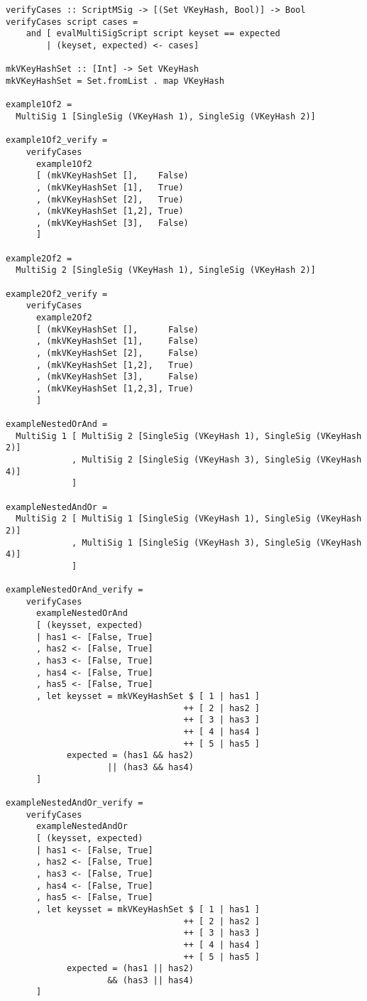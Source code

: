 \documentclass[11pt,a4paper,dvipsnames]{article}
\theoremstyle{definition}
\begin{document}
\begin{verbatim}
verifyCases :: ScriptMSig -> [(Set VKeyHash, Bool)] -> Bool
verifyCases script cases =
    and [ evalMultiSigScript script keyset == expected
        | (keyset, expected) <- cases]

mkVKeyHashSet :: [Int] -> Set VKeyHash
mkVKeyHashSet = Set.fromList . map VKeyHash

example1Of2 =
  MultiSig 1 [SingleSig (VKeyHash 1), SingleSig (VKeyHash 2)]

example1Of2_verify =
    verifyCases
      example1Of2
      [ (mkVKeyHashSet [],    False)
      , (mkVKeyHashSet [1],   True)
      , (mkVKeyHashSet [2],   True)
      , (mkVKeyHashSet [1,2], True)
      , (mkVKeyHashSet [3],   False)
      ]

example2Of2 =
  MultiSig 2 [SingleSig (VKeyHash 1), SingleSig (VKeyHash 2)]

example2Of2_verify =
    verifyCases
      example2Of2
      [ (mkVKeyHashSet [],      False)
      , (mkVKeyHashSet [1],     False)
      , (mkVKeyHashSet [2],     False)
      , (mkVKeyHashSet [1,2],   True)
      , (mkVKeyHashSet [3],     False)
      , (mkVKeyHashSet [1,2,3], True)
      ]

exampleNestedOrAnd =
  MultiSig 1 [ MultiSig 2 [SingleSig (VKeyHash 1), SingleSig (VKeyHash 2)]
             , MultiSig 2 [SingleSig (VKeyHash 3), SingleSig (VKeyHash 4)]
             ]

exampleNestedAndOr =
  MultiSig 2 [ MultiSig 1 [SingleSig (VKeyHash 1), SingleSig (VKeyHash 2)]
             , MultiSig 1 [SingleSig (VKeyHash 3), SingleSig (VKeyHash 4)]
             ]

exampleNestedOrAnd_verify =
    verifyCases
      exampleNestedOrAnd
      [ (keysset, expected)
      | has1 <- [False, True]
      , has2 <- [False, True]
      , has3 <- [False, True]
      , has4 <- [False, True]
      , has5 <- [False, True]
      , let keysset = mkVKeyHashSet $ [ 1 | has1 ]
                                   ++ [ 2 | has2 ]
                                   ++ [ 3 | has3 ]
                                   ++ [ 4 | has4 ]
                                   ++ [ 5 | has5 ]
            expected = (has1 && has2)
                    || (has3 && has4)
      ]

exampleNestedAndOr_verify =
    verifyCases
      exampleNestedAndOr
      [ (keysset, expected)
      | has1 <- [False, True]
      , has2 <- [False, True]
      , has3 <- [False, True]
      , has4 <- [False, True]
      , has5 <- [False, True]
      , let keysset = mkVKeyHashSet $ [ 1 | has1 ]
                                   ++ [ 2 | has2 ]
                                   ++ [ 3 | has3 ]
                                   ++ [ 4 | has4 ]
                                   ++ [ 5 | has5 ]
            expected = (has1 || has2)
                    && (has3 || has4)
      ]
\end{verbatim}


\end{document}
